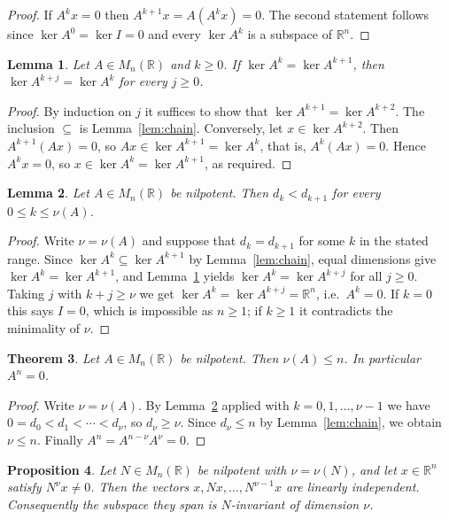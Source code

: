 \documentclass[11pt]{amsart}
\newtheorem{theorem}{Theorem}[section]
\newtheorem{lemma}[theorem]{Lemma}
\newtheorem{proposition}[theorem]{Proposition}
\theoremstyle{definition}
\theoremstyle{remark}
\newcommand{\R}{\mathbb{R}}
\newcommand{\M}{M_n(\R)}
\begin{document}
\begin{proof}
If $A^kx=0$ then $A^{k+1}x=A(A^kx)=0$. The second statement follows since
$\ker A^0=\ker I=0$ and every $\ker A^k$ is a subspace of $\R^n$.
\end{proof}

\begin{lemma}\label{lem:stab}
Let $A\in\M$ and $k\ge 0$. If $\ker A^k=\ker A^{k+1}$, then
$\ker A^{k+j}=\ker A^k$ for every $j\ge 0$.
\end{lemma}

\begin{proof}
By induction on $j$ it suffices to show that $\ker A^{k+1}=\ker A^{k+2}$.
The inclusion $\subseteq$ is Lemma~\ref{lem:chain}. Conversely, let
$x\in\ker A^{k+2}$. Then $A^{k+1}(Ax)=0$, so
$Ax\in\ker A^{k+1}=\ker A^k$, that is, $A^k(Ax)=0$. Hence $A^kx=0$, so
$x\in\ker A^k=\ker A^{k+1}$, as required.
\end{proof}

\begin{lemma}\label{lem:strict}
Let $A\in\M$ be nilpotent. Then $d_k<d_{k+1}$ for every $0\le k\le\nu(A)$.
\end{lemma}

\begin{proof}
Write $\nu=\nu(A)$ and suppose that $d_k=d_{k+1}$ for some $k$ in the stated
range. Since $\ker A^k\subseteq\ker A^{k+1}$ by Lemma~\ref{lem:chain}, equal
dimensions give $\ker A^k=\ker A^{k+1}$, and Lemma~\ref{lem:stab} yields
$\ker A^k=\ker A^{k+j}$ for all $j\ge 0$. Taking $j$ with $k+j\ge\nu$ we get
$\ker A^k=\ker A^{k+j}=\R^n$, i.e.\ $A^k=0$. If $k=0$ this says $I=0$, which
is impossible as $n\ge 1$; if $k\ge 1$ it contradicts the minimality of $\nu$.
\end{proof}

\begin{theorem}\label{thm:main}
Let $A\in\M$ be nilpotent. Then $\nu(A)\le n$. In particular $A^n=0$.
\end{theorem}

\begin{proof}
Write $\nu=\nu(A)$. By Lemma~\ref{lem:strict} applied with
$k=0,1,\dots,\nu-1$ we have $0=d_0<d_1<\cdots<d_\nu$, so $d_\nu\ge\nu$.
Since $d_\nu\le n$ by Lemma~\ref{lem:chain}, we obtain $\nu\le n$. Finally
$A^n=A^{n-\nu}A^\nu=0$.
\end{proof}

\begin{proposition}\label{prop:cyclic}
Let $N\in\M$ be nilpotent with $\nu=\nu(N)$, and let $x\in\R^n$ satisfy
$N^{\nu}x\ne 0$. Then the vectors $x,Nx,\dots,N^{\nu-1}x$ are linearly
independent. Consequently the subspace they span is $N$-invariant of
dimension $\nu$.
\end{proposition}
\end{document}

